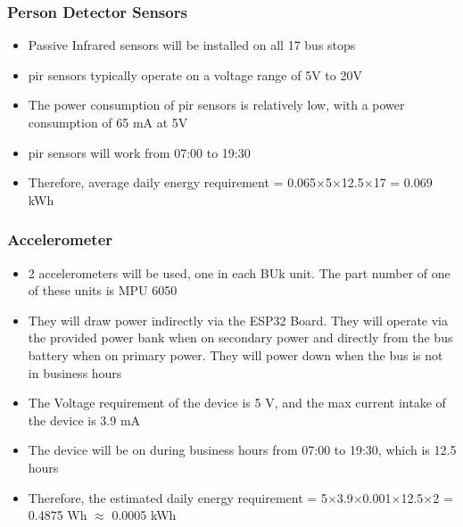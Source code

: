 \documentclass[12pt]{article} %
\begin{document}
\subsubsection{Person Detector Sensors}
\begin{itemize}
    \item Passive Infrared sensors will be installed on all 17 bus stops
    \item \acrfull{pir} sensors typically operate on a voltage range of 5V to 20V
    \item The power consumption of \acrshort{pir} sensors is relatively low, with a power consumption of 65 mA at 5V
    \item \acrshort{pir} sensors will work from 07:00 to 19:30
    \item Therefore, average daily energy requirement = 0.065$\times$5$\times$12.5$\times$17 = 0.069 kWh

\end{itemize}

\subsubsection{\gls{Accelerometer}}
\begin{itemize}
    \item 2 accelerometers will be used, one in each BUk unit. The part number of one of these units is \gls{MPU 6050}
    \item They will draw power indirectly via the ESP32 Board. They will operate via the provided power bank when on secondary power and directly from the bus battery when on primary power. They will power down when the bus is not in business hours
    \item The Voltage requirement of the device is 5 V, and the max current intake of the device is 3.9 mA
    \item The device will be on during business hours from 07:00 to 19:30, which is 12.5 hours
    \item Therefore, the estimated daily energy requirement = 5$\times$3.9$\times$0.001$\times$12.5$\times$2 = 0.4875 Wh $\approx$ 0.0005 kWh

\end{itemize}
\end{document}
